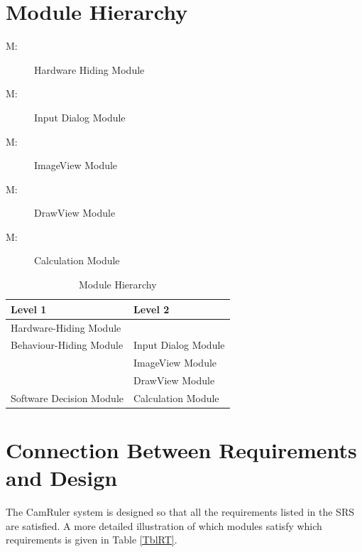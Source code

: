\documentclass[12pt, titlepage]{article}
\newcounter{mnum}
\newcommand{\mthemnum}{M\themnum}
\begin{document}
\section{Module Hierarchy} \label{SecMH}

\begin{description}
\item [ \mthemnum \label{mHH}:] Hardware Hiding Module
\item [ \mthemnum \label{mIN}:] Input Dialog Module
\item [ \mthemnum \label{mPT}:] ImageView Module
\item [ \mthemnum \label{mDR}:] DrawView Module
\item [ \mthemnum \label{mCA}:] Calculation Module
\end{description}


\begin{table}[h!]
\centering
\begin{tabular}{p{} p{}}
\toprule
\textbf{Level 1} & \textbf{Level 2}\\
\midrule

Hardware-Hiding Module &  \\
\midrule

Behaviour-Hiding Module & Input Dialog Module\\
& ImageView Module\\
& DrawView Module\\
\midrule

Software Decision Module & Calculation Module\\
\bottomrule

\end{tabular}
\caption{Module Hierarchy}
\label{TblMH}
\end{table}

\section{Connection Between Requirements and Design} \label{SecConnection}

The CamRuler system is designed so that all the requirements listed in the SRS are satisfied. A more detailed illustration of which modules satisfy which requirements is given in Table \ref{TblRT}.\\
\end{document}
